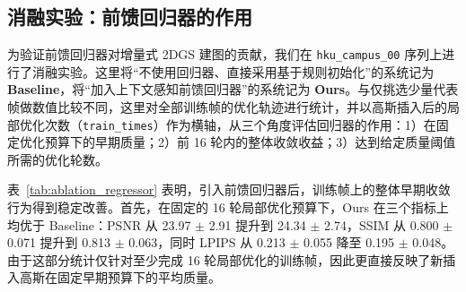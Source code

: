 \subsection{消融实验：前馈回归器的作用}

为验证前馈回归器对增量式 2DGS 建图的贡献，我们在 \texttt{hku\_campus\_00} 序列上进行了消融实验。这里将“不使用回归器、直接采用基于规则初始化”的系统记为 \textbf{Baseline}，将“加入上下文感知前馈回归器”的系统记为 \textbf{Ours}。与仅挑选少量代表帧做数值比较不同，这里对全部训练帧的优化轨迹进行统计，并以高斯插入后的局部优化次数（\texttt{train\_times}）作为横轴，从三个角度评估回归器的作用：1）在固定优化预算下的早期质量；2）前 16 轮内的整体收敛收益；3）达到给定质量阈值所需的优化轮数。

\begin{table}[!t]
\centering
\caption{前馈回归器消融实验结果（\texttt{hku\_campus\_00}）。统计基于全部训练帧的优化轨迹：前两行给出 16 轮优化时的 mean $\pm$ std；中两行为前 16 轮的 AUC；后两行为达到指定质量阈值所需优化轮数的 mean $\pm$ std，括号中给出成功达到阈值的帧数。}
\label{tab:ablation_regressor}
\renewcommand{\arraystretch}{1.18}
\end{table}

表~\ref{tab:ablation_regressor} 表明，引入前馈回归器后，训练帧上的整体早期收敛行为得到稳定改善。首先，在固定的 16 轮局部优化预算下，Ours 在三个指标上均优于 Baseline：PSNR 从 23.97 $\pm$ 2.91 提升到 24.34 $\pm$ 2.74，SSIM 从 0.800 $\pm$ 0.071 提升到 0.813 $\pm$ 0.063，同时 LPIPS 从 0.213 $\pm$ 0.055 降至 0.195 $\pm$ 0.048。由于这部分统计仅针对至少完成 16 轮局部优化的训练帧，因此更直接反映了新插入高斯在固定早期预算下的平均质量。

